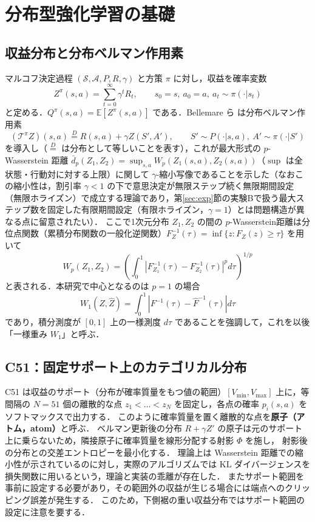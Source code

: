 \documentclass[a4paper,10pt]{jsarticle}
\theoremstyle{definition}
\newcommand{\Wone}{W_1}
\renewcommand{\Finv}{F^{-1}}
\newcommand{\Fhinv}{\hat{F}^{-1}}
\newcommand{\E}{\mathbb{E}}
\begin{document}
\section{分布型強化学習の基礎}
\label{sec:drl}

\subsection{収益分布と分布ベルマン作用素}
マルコフ決定過程 $(\mathcal{S},\mathcal{A},P,R,\gamma)$ と方策 $\pi$ に対し，収益を確率変数
\begin{equation}
  Z^\pi(s,a)=\sum_{t=0}^{\infty}\gamma^t R_t,\qquad s_0=s,\ a_0=a,\ a_t\sim\pi(\cdot|s_t)
\end{equation}
と定める．$Q^\pi(s,a)=\E[Z^\pi(s,a)]$ である．Bellemare ら \cite{bellemare2017c51} は分布ベルマン作用素
\begin{equation}
  (\mathcal{T}^\pi Z)(s,a)\overset{D}{=}R(s,a)+\gamma Z(S',A'),\qquad S'\sim P(\cdot|s,a),\ A'\sim\pi(\cdot|S')
\end{equation}
を導入し（$\overset{D}{=}$ は分布として等しいことを表す），これが最大形式の $p$-Wasserstein 距離 $\bar d_p(Z_1,Z_2)=\sup_{s,a}W_p(Z_1(s,a),Z_2(s,a))$（$\sup$ は全状態・行動対に対する上限）に関して
$\gamma$-縮小写像であることを示した（なおこの縮小性は，割引率 $\gamma<1$ の下で意思決定が無限ステップ続く無限期間設定（無限ホライズン）で成立する理論であり，第\ref{sec:exp}節の実験Bで扱う最大ステップ数を固定した有限期間設定（有限ホライズン，$\gamma=1$）とは問題構造が異なる点に留意されたい）．
ここで1次元分布 $Z_1,Z_2$ の間の $p$-Wasserstein距離は分位点関数（累積分布関数の一般化逆関数）$F^{-1}_{Z}(\tau)=\inf\{z:F_Z(z)\ge\tau\}$ を用いて
\begin{equation}
  W_p(Z_1,Z_2)=\left(\int_0^1\left|F_{Z_1}^{-1}(\tau)-F_{Z_2}^{-1}(\tau)\right|^p d\tau\right)^{1/p}
  \label{eq:wp}
\end{equation}
と表される．本研究で中心となるのは $p=1$ の場合
\begin{equation}
  \Wone(Z,\hat Z)=\int_0^1\left|\Finv(\tau)-\Fhinv(\tau)\right|d\tau
  \label{eq:w1}
\end{equation}
であり，積分測度が $[0,1]$ 上の一様測度 $d\tau$ であることを強調して，これを以後「一様重み $\Wone$」と呼ぶ．

\subsection{C51：固定サポート上のカテゴリカル分布}
C51 \cite{bellemare2017c51} は収益のサポート（分布が確率質量をもつ値の範囲）$[V_{\min},V_{\max}]$ 上に，等間隔の $N=51$ 個の離散的な点
$z_1<\dots<z_N$ を固定し，各点の確率 $p_i(s,a)$ をソフトマックスで出力する．
このように確率質量を置く離散的な点を\textbf{原子（アトム，atom）}と呼ぶ．
ベルマン更新後の分布 $R+\gamma Z'$ の原子は元のサポート上に乗らないため，隣接原子に確率質量を線形分配する射影 $\Phi$ を施し，
射影後の分布との交差エントロピーを最小化する．
理論上は Wasserstein 距離での縮小性が示されているのに対し，実際のアルゴリズムでは KL ダイバージェンスを損失関数に用いるという，理論と実装の乖離が存在した．
またサポート範囲を事前に設定する必要があり，その範囲外の収益が生じる場合には端点へのクリッピング誤差が発生する．
このため，下側裾の重い収益分布ではサポート範囲の設定に注意を要する．
\end{document}
